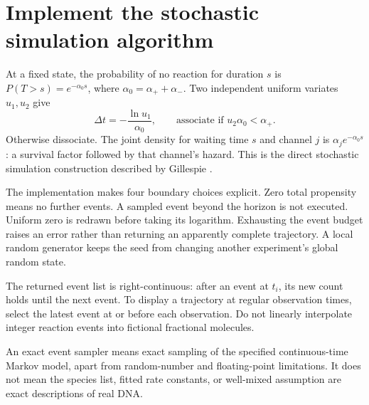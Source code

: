 
\section{Implement the stochastic simulation algorithm}

At a fixed state, the probability of no reaction for duration $s$ is
$P(T>s)=e^{-\alpha_0s}$, where $\alpha_0=\alpha_++\alpha_-$.
Two independent uniform variates $u_1,u_2$ give
\begin{equation}
 \Delta t=-\frac{\ln u_1}{\alpha_0},\qquad
 \text{associate if }u_2\alpha_0<\alpha_+.
\end{equation}
Otherwise dissociate. The joint density for waiting time $s$ and channel
$j$ is $\alpha_j e^{-\alpha_0s}$: a survival factor followed by that
channel's hazard. This is the direct stochastic simulation construction
described by Gillespie \cite{Gillespie1977}.


The implementation makes four boundary choices explicit. Zero total
propensity means no further events. A sampled event beyond the horizon
is not executed. Uniform zero is redrawn before taking its logarithm.
Exhausting the event budget raises an error rather than returning an
apparently complete trajectory. A local random generator keeps the seed
from changing another experiment's global random state.

The returned event list is right-continuous: after an event at $t_i$,
its new count holds until the next event. To display a trajectory at
regular observation times, select the latest event at or before each
observation. Do not linearly interpolate integer reaction events into
fictional fractional molecules.


An exact event sampler means exact sampling of the specified continuous-time
Markov model, apart from random-number and floating-point limitations.
It does not mean the species list, fitted rate constants, or well-mixed
assumption are exact descriptions of real DNA.

